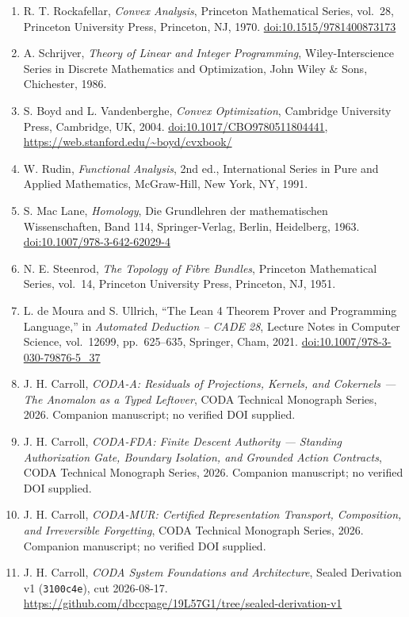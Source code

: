 \documentclass[
  11pt,
]{article}
\providecommand{\tightlist}{%
  \setlength{\itemsep}{0pt}\setlength{\parskip}{0pt}}
\begin{document}
\begin{enumerate}
\def\labelenumi{\arabic{enumi}.}
\tightlist
\item
  R. T. Rockafellar, \emph{Convex Analysis}, Princeton Mathematical Series, vol.~28, Princeton University Press, Princeton, NJ, 1970. \href{https://doi.org/10.1515/9781400873173}{doi:10.1515/9781400873173}
\item
  A. Schrijver, \emph{Theory of Linear and Integer Programming}, Wiley-Interscience Series in Discrete Mathematics and Optimization, John Wiley \& Sons, Chichester, 1986.
\item
  S. Boyd and L. Vandenberghe, \emph{Convex Optimization}, Cambridge University Press, Cambridge, UK, 2004. \href{https://doi.org/10.1017/CBO9780511804441}{doi:10.1017/CBO9780511804441}, \url{https://web.stanford.edu/~boyd/cvxbook/}
\item
  W. Rudin, \emph{Functional Analysis}, 2nd ed., International Series in Pure and Applied Mathematics, McGraw-Hill, New York, NY, 1991.
\item
  S. Mac Lane, \emph{Homology}, Die Grundlehren der mathematischen Wissenschaften, Band 114, Springer-Verlag, Berlin, Heidelberg, 1963. \href{https://doi.org/10.1007/978-3-642-62029-4}{doi:10.1007/978-3-642-62029-4}
\item
  N. E. Steenrod, \emph{The Topology of Fibre Bundles}, Princeton Mathematical Series, vol.~14, Princeton University Press, Princeton, NJ, 1951.
\item
  L. de Moura and S. Ullrich, ``The Lean 4 Theorem Prover and Programming Language,'' in \emph{Automated Deduction -- CADE 28}, Lecture Notes in Computer Science, vol.~12699, pp.~625--635, Springer, Cham, 2021. \href{https://doi.org/10.1007/978-3-030-79876-5_37}{doi:10.1007/978-3-030-79876-5\_37}
\item
  J. H. Carroll, \emph{CODA-A: Residuals of Projections, Kernels, and Cokernels --- The Anomalon as a Typed Leftover}, CODA Technical Monograph Series, 2026. Companion manuscript; no verified DOI supplied.
\item
  J. H. Carroll, \emph{CODA-FDA: Finite Descent Authority --- Standing Authorization Gate, Boundary Isolation, and Grounded Action Contracts}, CODA Technical Monograph Series, 2026. Companion manuscript; no verified DOI supplied.
\item
  J. H. Carroll, \emph{CODA-MUR: Certified Representation Transport, Composition, and Irreversible Forgetting}, CODA Technical Monograph Series, 2026. Companion manuscript; no verified DOI supplied.
\item
  J. H. Carroll, \emph{CODA System Foundations and Architecture}, Sealed Derivation v1 (\texttt{3100c4e}), cut 2026-08-17. \url{https://github.com/dbccpage/19L57G1/tree/sealed-derivation-v1}
\end{enumerate}
\end{document}

